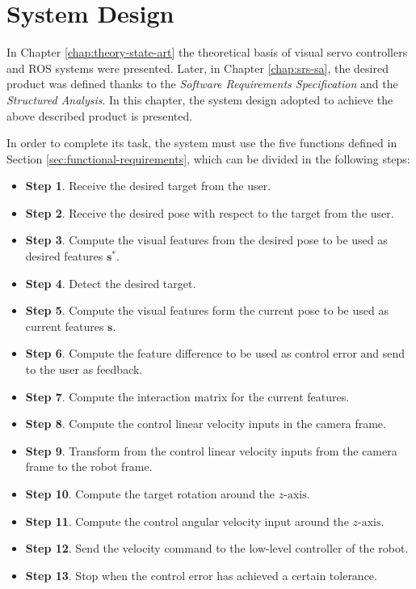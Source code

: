 
\chapter{System Design}
\label{chap:system-design}

In Chapter \ref{chap:theory-state-art} the theoretical basis of visual servo controllers and ROS systems were presented. Later, in Chapter \ref{chap:srs-sa}, the desired product was defined thanks to the \emph{Software Requirements Specification} and the \emph{Structured Analysis}. In this chapter, the system design adopted to achieve the above described product is presented.

In order to complete its task, the system must use the five functions defined in Section \ref{sec:functional-requirements}, which can be divided in the following steps:

\begin{itemize}
	\item \textbf{Step 1}. Receive the desired target from the user.
	
	\item \textbf{Step 2}. Receive the desired pose with respect to the target from the user.
	
	\item \textbf{Step 3}. Compute the visual features from the desired pose to be used as desired features $\bm{s}^\ast$.
	
	\item \textbf{Step 4}. Detect the desired target.
	
	\item \textbf{Step 5}. Compute the visual features form the current pose to be used as current features $\bm{s}$.
	
	\item \textbf{Step 6}. Compute the feature difference to be used as control error and send to the user as feedback.
	
	\item \textbf{Step 7}. Compute the interaction matrix for the current features.
	
	\item \textbf{Step 8}. Compute the control linear velocity inputs in the camera frame.
	
	\item \textbf{Step 9}. Transform from the control linear velocity inputs from the camera frame to the robot frame.
	
	\item \textbf{Step 10}. Compute the target rotation around the $z\text{-axis}$.
	
	\item \textbf{Step 11}. Compute the control angular velocity input around the $z\text{-axis}$.
	
	\item \textbf{Step 12}. Send the velocity command to the low-level controller of the robot.
	
	\item \textbf{Step 13}. Stop when the control error has achieved a certain tolerance.
\end{itemize}
	
